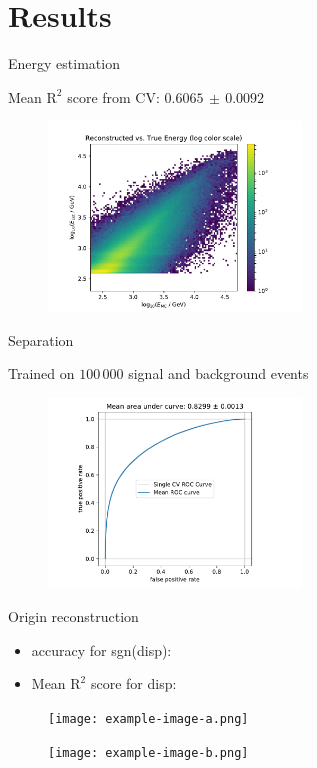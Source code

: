 \section{Results}
\begin{frame}[t]{Energy estimation}

Mean $\text{R}^2$ score from CV: $0.6065\,\pm\,0.0092$

\begin{figure}
    \centering
    \includegraphics[width=0.6\textwidth,page=1]{fig/energy-performance.pdf}
\end{figure}
\end{frame}

\begin{frame}[t]{Separation}

Trained on $100\,000$ signal and background events 
\begin{figure}
    \centering
    \includegraphics[width=0.6\textwidth,page=1]{fig/separation_performance.pdf}
\end{figure}
\end{frame}

\begin{frame}[t]{Origin reconstruction}
\begin{itemize}
    \item accuracy for sgn(disp):
    \item Mean $\text{R}^2$ score for disp: 
\end{itemize}
\begin{multicols}{2}
\begin{figure}
    \centering
    \texttt{[image: example-image-a.png]}
\end{figure}
\columnbreak
\begin{figure}
    \centering
    \texttt{[image: example-image-b.png]}
\end{figure}
\end{multicols}
\end{frame}

